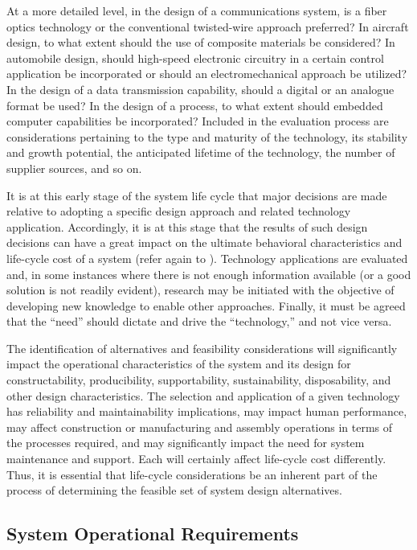 At a more detailed level, in the design of a communications system, is a fiber optics technology or the conventional twisted-wire approach preferred? In aircraft design, to what extent should the use of composite materials be considered? In automobile design, should high-speed electronic circuitry in a certain control application be incorporated or should an electromechanical approach be utilized? In the design of a data transmission capability, should a digital or an analogue format be used? In the design of a process, to what extent should embedded computer capabilities be incorporated? Included in the evaluation process are considerations pertaining to the type and maturity of the technology, its stability and growth potential, the anticipated lifetime of the technology, the number of supplier sources, and so on.

It is at this early stage of the system life cycle that major decisions are made relative to adopting a specific design approach and related technology application. Accordingly, it is at this stage that the results of such design decisions can have a great impact on the ultimate behavioral characteristics and life-cycle cost of a system (refer again to ). Technology applications are evaluated and, in some instances where there is not enough information available (or a good solution is not readily evident), research may be initiated with the objective of developing new knowledge to enable other approaches. Finally, it must be agreed that the ``need'' should dictate and drive the ``technology,'' and not vice versa.

The identification of alternatives and feasibility considerations will significantly impact the operational characteristics of the system and its design for constructability, producibility, supportability, sustainability, disposability, and other design characteristics. The selection and application of a given technology has reliability and maintainability implications, may impact human performance, may affect construction or manufacturing and assembly operations in terms of the processes required, and may significantly impact the need for system maintenance and support. Each will certainly affect life-cycle cost differently. Thus, it is essential that life-cycle considerations be an inherent part of the process of determining the feasible set of system design alternatives.

\subsection{System Operational Requirements}

